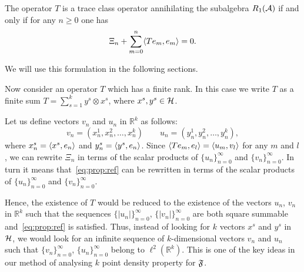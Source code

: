 \documentclass[12pt]{amsart}
\theoremstyle{case}
\begin{document}
  \begin{prop}
    \label{prop:reformulation}
    The operator $T$ is a trace class operator annihilating the subalgebra $R_1(\cal{A})$ if and only if
      for any $n \geq 0$ one has 
        \begin{equation}
          \label{eq:prop:ref}
          \Xi_n + \sum_{m=0}^n \inner{Te_m}{e_m} = 0.
        \end{equation}
  \end{prop}
    We will use this formulation in the following sections.

  \medskip
  Now consider an operator $T$ which has a finite rank.
  In this case we write $T$ as a finite sum $T = \sum_{s=1}^k y^s \otimes x^s$,
    where $x^s, y^s \in \cal{H}$.

  Let us define vectors $v_n$ and $u_n$ in $\mathbb{R}^k$ as follows:
  \begin{equation*}
    v_n = (x^1_n, x^2_n, \dots, x^k_n)\qquad
    u_n = (y^1_n, y^2_n, \dots, y^k_n),
  \end{equation*}
  where $x^s_n = \inner{x^s}{e_n}$ and $y^s_n = \inner{y^s}{e_n}$.
  Since $\inner{Te_m}{e_l} = \inner{u_m}{v_l}$ for any $m$ and $l$, we can rewrite $\Xi_n$ in terms of
    the scalar products of $\{u_n\}_{n=0}^\infty$ and $\{v_n\}_{n=0}^\infty$.
  In turn it means that~\eqref{eq:prop:ref} can be rewritten in terms of the scalar products
    of $\{u_n\}_{n=0}^\infty$ and $\{v_n\}_{n=0}^\infty$.

  Hence, the existence of $T$ would be reduced to the existence of
    the vectors $u_n$, $v_n$ in $\mathbb{R}^k$ such that the sequences $\{\lvert u_n\rvert\}_{n=0}^\infty$,
    $\{\lvert v_n\rvert\}_{n=0}^\infty$ are both square summable and~\eqref{eq:prop:ref} is satisfied.
  Thus, instead of looking for $k$ vectors $x^s$ and $y^s$ in $\cal{H}$, we would look for an infinite sequence
    of $k$-dimensional vectors $v_n$ and $u_n$ such that $\{v_n \}_{n=0}^\infty$, $\{u_n\}_{n=0}^\infty$ belong to $\ell^2(\mathbb{R}^k)$.
  This is one of the key ideas in our method of analysing $k$ point density property for $\fsys$.
\end{document}

